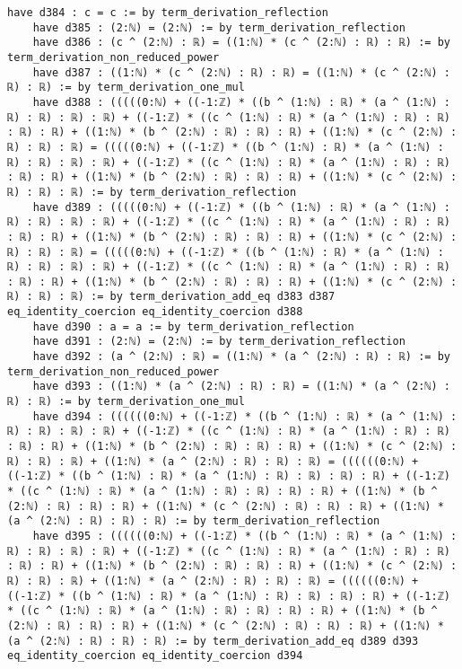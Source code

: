 \documentclass{article}
\begin{document}
\begin{tcolorbox}[colback=white!10, width=\linewidth]
\begin{lstlisting}[language=Lean4]
    have d384 : c = c := by term_derivation_reflection
    have d385 : (2:ℕ) = (2:ℕ) := by term_derivation_reflection
    have d386 : (c ^ (2:ℕ) : ℝ) = ((1:ℕ) * (c ^ (2:ℕ) : ℝ) : ℝ) := by term_derivation_non_reduced_power
    have d387 : ((1:ℕ) * (c ^ (2:ℕ) : ℝ) : ℝ) = ((1:ℕ) * (c ^ (2:ℕ) : ℝ) : ℝ) := by term_derivation_one_mul
    have d388 : (((((0:ℕ) + ((-1:ℤ) * ((b ^ (1:ℕ) : ℝ) * (a ^ (1:ℕ) : ℝ) : ℝ) : ℝ) : ℝ) + ((-1:ℤ) * ((c ^ (1:ℕ) : ℝ) * (a ^ (1:ℕ) : ℝ) : ℝ) : ℝ) : ℝ) + ((1:ℕ) * (b ^ (2:ℕ) : ℝ) : ℝ) : ℝ) + ((1:ℕ) * (c ^ (2:ℕ) : ℝ) : ℝ) : ℝ) = (((((0:ℕ) + ((-1:ℤ) * ((b ^ (1:ℕ) : ℝ) * (a ^ (1:ℕ) : ℝ) : ℝ) : ℝ) : ℝ) + ((-1:ℤ) * ((c ^ (1:ℕ) : ℝ) * (a ^ (1:ℕ) : ℝ) : ℝ) : ℝ) : ℝ) + ((1:ℕ) * (b ^ (2:ℕ) : ℝ) : ℝ) : ℝ) + ((1:ℕ) * (c ^ (2:ℕ) : ℝ) : ℝ) : ℝ) := by term_derivation_reflection
    have d389 : (((((0:ℕ) + ((-1:ℤ) * ((b ^ (1:ℕ) : ℝ) * (a ^ (1:ℕ) : ℝ) : ℝ) : ℝ) : ℝ) + ((-1:ℤ) * ((c ^ (1:ℕ) : ℝ) * (a ^ (1:ℕ) : ℝ) : ℝ) : ℝ) : ℝ) + ((1:ℕ) * (b ^ (2:ℕ) : ℝ) : ℝ) : ℝ) + ((1:ℕ) * (c ^ (2:ℕ) : ℝ) : ℝ) : ℝ) = (((((0:ℕ) + ((-1:ℤ) * ((b ^ (1:ℕ) : ℝ) * (a ^ (1:ℕ) : ℝ) : ℝ) : ℝ) : ℝ) + ((-1:ℤ) * ((c ^ (1:ℕ) : ℝ) * (a ^ (1:ℕ) : ℝ) : ℝ) : ℝ) : ℝ) + ((1:ℕ) * (b ^ (2:ℕ) : ℝ) : ℝ) : ℝ) + ((1:ℕ) * (c ^ (2:ℕ) : ℝ) : ℝ) : ℝ) := by term_derivation_add_eq d383 d387 eq_identity_coercion eq_identity_coercion d388
    have d390 : a = a := by term_derivation_reflection
    have d391 : (2:ℕ) = (2:ℕ) := by term_derivation_reflection
    have d392 : (a ^ (2:ℕ) : ℝ) = ((1:ℕ) * (a ^ (2:ℕ) : ℝ) : ℝ) := by term_derivation_non_reduced_power
    have d393 : ((1:ℕ) * (a ^ (2:ℕ) : ℝ) : ℝ) = ((1:ℕ) * (a ^ (2:ℕ) : ℝ) : ℝ) := by term_derivation_one_mul
    have d394 : ((((((0:ℕ) + ((-1:ℤ) * ((b ^ (1:ℕ) : ℝ) * (a ^ (1:ℕ) : ℝ) : ℝ) : ℝ) : ℝ) + ((-1:ℤ) * ((c ^ (1:ℕ) : ℝ) * (a ^ (1:ℕ) : ℝ) : ℝ) : ℝ) : ℝ) + ((1:ℕ) * (b ^ (2:ℕ) : ℝ) : ℝ) : ℝ) + ((1:ℕ) * (c ^ (2:ℕ) : ℝ) : ℝ) : ℝ) + ((1:ℕ) * (a ^ (2:ℕ) : ℝ) : ℝ) : ℝ) = ((((((0:ℕ) + ((-1:ℤ) * ((b ^ (1:ℕ) : ℝ) * (a ^ (1:ℕ) : ℝ) : ℝ) : ℝ) : ℝ) + ((-1:ℤ) * ((c ^ (1:ℕ) : ℝ) * (a ^ (1:ℕ) : ℝ) : ℝ) : ℝ) : ℝ) + ((1:ℕ) * (b ^ (2:ℕ) : ℝ) : ℝ) : ℝ) + ((1:ℕ) * (c ^ (2:ℕ) : ℝ) : ℝ) : ℝ) + ((1:ℕ) * (a ^ (2:ℕ) : ℝ) : ℝ) : ℝ) := by term_derivation_reflection
    have d395 : ((((((0:ℕ) + ((-1:ℤ) * ((b ^ (1:ℕ) : ℝ) * (a ^ (1:ℕ) : ℝ) : ℝ) : ℝ) : ℝ) + ((-1:ℤ) * ((c ^ (1:ℕ) : ℝ) * (a ^ (1:ℕ) : ℝ) : ℝ) : ℝ) : ℝ) + ((1:ℕ) * (b ^ (2:ℕ) : ℝ) : ℝ) : ℝ) + ((1:ℕ) * (c ^ (2:ℕ) : ℝ) : ℝ) : ℝ) + ((1:ℕ) * (a ^ (2:ℕ) : ℝ) : ℝ) : ℝ) = ((((((0:ℕ) + ((-1:ℤ) * ((b ^ (1:ℕ) : ℝ) * (a ^ (1:ℕ) : ℝ) : ℝ) : ℝ) : ℝ) + ((-1:ℤ) * ((c ^ (1:ℕ) : ℝ) * (a ^ (1:ℕ) : ℝ) : ℝ) : ℝ) : ℝ) + ((1:ℕ) * (b ^ (2:ℕ) : ℝ) : ℝ) : ℝ) + ((1:ℕ) * (c ^ (2:ℕ) : ℝ) : ℝ) : ℝ) + ((1:ℕ) * (a ^ (2:ℕ) : ℝ) : ℝ) : ℝ) := by term_derivation_add_eq d389 d393 eq_identity_coercion eq_identity_coercion d394

\end{lstlisting}
\end{tcolorbox}
\end{document}

